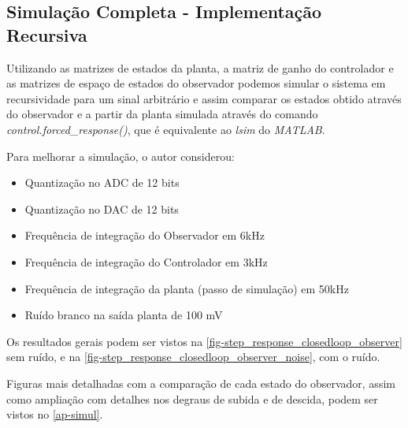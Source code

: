 \documentclass[
	12pt,				%
	article,			%
	openright,			%
	oneside,
	a4paper,			%
	chapter=TITLE,		%
	section=TITLE,		%
	english,			%
	french,				%
	spanish,			%
	brazil,				%
]{abntex2}
\begin{document}
            \subsection{Simulação Completa - Implementação Recursiva}
            
                Utilizando as matrizes de estados da planta, a matriz de ganho do controlador e as matrizes de espaço de estados do observador podemos simular o sistema em recursividade para um sinal arbitrário e assim comparar os estados obtido através do observador e a partir da planta simulada através do comando \textit{control.forced\_response()}, que é equivalente ao \textit{lsim} do \textit{MATLAB}.
                
                Para melhorar a simulação, o autor considerou:
                \begin{itemize}
                    \item Quantização no ADC de 12 bits
                    \item Quantização no DAC de 12 bits
                    \item Frequência de integração do Observador em 6kHz
                    \item Frequência de integração do Controlador em 3kHz
                    \item Frequência de integração da planta (passo de simulação) em 50kHz
                    \item Ruído branco na saída planta de 100 mV
                \end{itemize}
                
                Os resultados gerais podem ser vistos na \autoref{fig-step_response_closedloop_observer} sem ruído, e na  \autoref{fig-step_response_closedloop_observer_noise}, com o ruído. 
                
                Figuras mais detalhadas com a comparação de cada estado do observador, assim como ampliação com detalhes nos degraus de subida e de descida, podem ser vistos no \autoref{ap-simul}.
                
                \FloatBarrier
                
\end{document}

